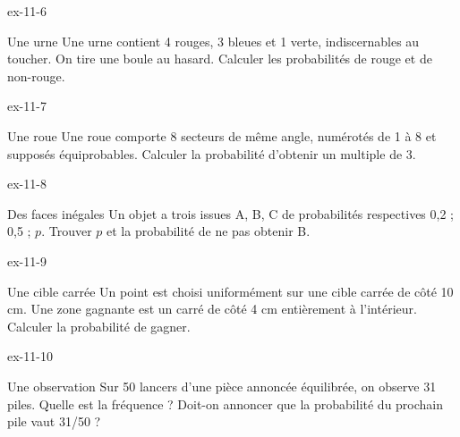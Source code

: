\begin{blocLivre}{ex-11-6}\begin{exercice}[2]{Une urne}
Une urne contient 4 rouges, 3 bleues et 1 verte, indiscernables au toucher. On tire une boule au hasard. Calculer les probabilités de rouge et de non-rouge.
\label{fig-ex-11-6}
\end{exercice}\end{blocLivre}
\begin{blocLivre}{ex-11-7}\begin{exercice}[2]{Une roue}
Une roue comporte 8 secteurs de même angle, numérotés de 1 à 8 et supposés équiprobables. Calculer la probabilité d’obtenir un multiple de 3.
\label{fig-ex-11-7}
\end{exercice}\end{blocLivre}
\begin{blocLivre}{ex-11-8}\begin{exercice}[2]{Des faces inégales}
Un objet a trois issues A, B, C de probabilités respectives 0,2 ; 0,5 ; $p$. Trouver $p$ et la probabilité de ne pas obtenir B.
\end{exercice}\end{blocLivre}
\begin{blocLivre}{ex-11-9}\begin{exercice}[2]{Une cible carrée}
Un point est choisi uniformément sur une cible carrée de côté 10 cm. Une zone gagnante est un carré de côté 4 cm entièrement à l’intérieur. Calculer la probabilité de gagner.
\label{fig-ex-11-9}
\end{exercice}\end{blocLivre}
\begin{blocLivre}{ex-11-10}\begin{exercice}[2]{Une observation}
Sur 50 lancers d’une pièce annoncée équilibrée, on observe 31 piles. Quelle est la fréquence ? Doit-on annoncer que la probabilité du prochain pile vaut 31/50 ?
\end{exercice}\end{blocLivre}

